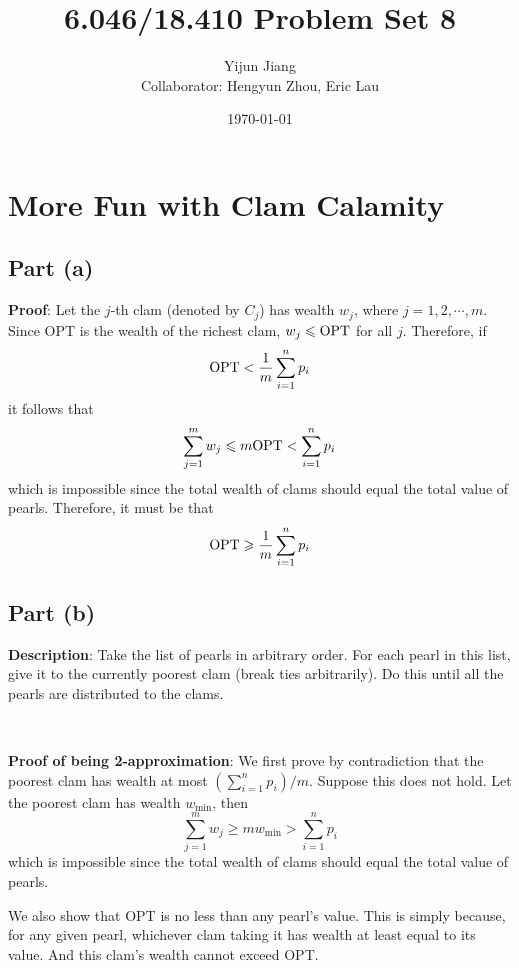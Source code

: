 \documentclass{article}
\title{6.046/18.410 Problem Set 8}
\author{Yijun Jiang\vspace{3pt}\\Collaborator: Hengyun Zhou, Eric Lau}
\date{\today}
\begin{document}
\maketitle

\section{More Fun with Clam Calamity}
\subsection{Part (a)}
\noindent\textbf{Proof}: Let the $j$-th clam (denoted by $C_j$) has wealth $w_j$, where $j=1,2,\cdots,m$. Since OPT is the wealth of the richest clam, $w_j\leqslant\textup{OPT}$ for all $j$. Therefore, if
\begin{equation*}
\textup{OPT}<\frac{1}{m}\sum_{i=1}^np_i
\end{equation*}
it follows that
\begin{equation*}
\sum_{j=1}^mw_j\leqslant m\textup{OPT}<\sum_{i=1}^np_i
\end{equation*}
which is impossible since the total wealth of clams should equal the total value of pearls. Therefore, it must be that
\begin{equation*}
\textup{OPT}\geqslant\frac{1}{m}\sum_{i=1}^np_i
\end{equation*}

\subsection{Part (b)}
\noindent\textbf{Description}: Take the list of pearls in arbitrary order. For each pearl in this list, give it to the currently poorest clam (break ties arbitrarily). Do this until all the pearls are distributed to the clams.

~

\noindent\textbf{Proof of being 2-approximation}: We first prove by contradiction that the poorest clam has wealth at most $(\sum_{i=1}^np_i)/m$. Suppose this does not hold. Let the poorest clam has wealth $w_{\min}$, then
\begin{equation*}
\sum_{j=1}^mw_j\geqslant mw_{\min}>\sum_{i=1}^np_i
\end{equation*}
which is impossible since the total wealth of clams should equal the total value of pearls.

We also show that OPT is no less than any pearl's value. This is simply because, for any given pearl, whichever clam taking it has wealth at least equal to its value. And this clam's wealth cannot exceed OPT.
\end{document}

